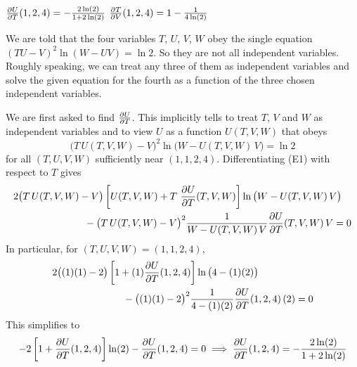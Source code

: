 \begin{answer}
$\pdiff{U}{T}(1,2,4) = -\frac{2\ln(2)}{1+2\ln(2)}$\qquad
$\pdiff{T}{V}(1,2,4) = 1 -\frac{1}{4\ln(2)}$
\end{answer}

\begin{solution}
We are told that the four variables $T$, $U$, $V$, $W$ obey the
single equation $(TU-V)^2 \ln(W-UV) = \ln 2$. So they are not all
independent variables. Roughly speaking, we can treat any three of them
as independent variables and solve the given equation for the fourth 
as a function of the three chosen independent variables.


We are first asked to find $\pdiff{U}{T}$. This implicitly tells to
treat $T$, $V$ and $W$ as independent variables and to view $U$
as a function $U(T,V,W)$ that obeys 
\begin{equation*}
\big(T\, U(T,V,W)-V\big)^2 \ln\big(W-U(T,V,W)\,V\big) = \ln 2
\tag{E1}\end{equation*}
for all $(T, U, V, W)$ sufficiently near $(1, 1, 2, 4)$.
Differentiating (E1) with respect to $T$ gives
\begin{align*}
&2\big(T\, U(T,V,W)-V\big)
         \left[ U(T,V,W) +T\ \pdiff{U}{T}(T,V,W)\right] 
            \ln\big(W-U(T,V,W)\,V\big) \\
&\hskip1in
  -\big(T\, U(T,V,W)-V\big)^2 \frac{1}{W-U(T,V,W)\,V}\pdiff{U}{T}(T,V,W)\,V = 0
\end{align*}
In particular, for $(T, U, V, W)=(1, 1, 2, 4)$,
\begin{align*}
&2\big((1)(1)-2\big)
         \left[ 1 +(1)\pdiff{U}{T}(1,2,4)\right] 
            \ln\big(4-(1)(2)\big) \\
&\hskip1in
  -\big((1)(1)-2\big)^2 \frac{1}{4-(1)(2)}\pdiff{U}{T}(1,2,4)\,(2) = 0
\end{align*}
This simplifies to
\begin{align*}
-2\left[ 1 +\pdiff{U}{T}(1,2,4)\right] \ln(2)
                        -\pdiff{U}{T}(1,2,4)=0 
\implies
\pdiff{U}{T}(1,2,4) = -\frac{2\ln(2)}{1+2\ln(2)}
\end{align*}

\medskip


\end{solution}
